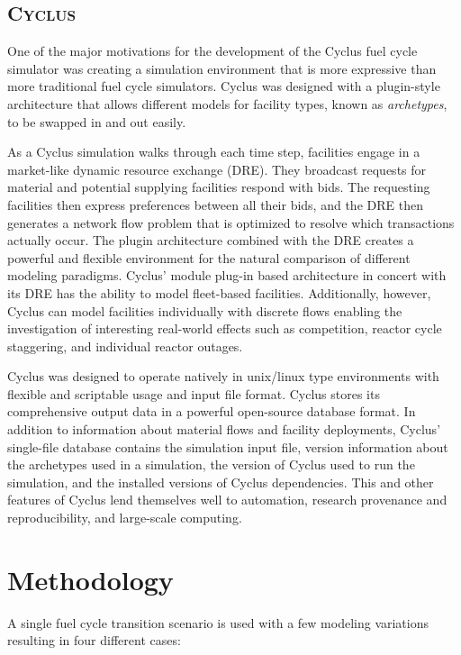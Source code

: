 \documentclass{style}
\newcommand{\Cyclus}{\textsc{Cyclus}\xspace}%
\begin{document}
\subsection{\Cyclus}

One of the major motivations for the development of the Cyclus fuel cycle
simulator \cite{cyclus_2015} was creating a simulation environment that is
more expressive than more traditional fuel cycle simulators.  Cyclus was
designed with a plugin-style architecture that allows different models for
facility types, known as \emph{archetypes}, to be swapped in and out easily.

As a Cyclus simulation walks through each time step, facilities engage in a
market-like dynamic resource exchange (DRE).  They broadcast requests for
material and potential supplying facilities respond with bids. The requesting facilities then
express preferences between all their bids, and the DRE then generates a network
flow problem that is optimized to resolve which transactions actually occur.
The plugin architecture combined with the DRE creates a powerful and flexible
environment for the natural comparison of different modeling paradigms.
Cyclus' module plug-in based architecture in concert with its DRE has the ability to
model fleet-based facilities.  Additionally, however, Cyclus can model
facilities individually with discrete flows enabling the investigation of
interesting real-world effects such as competition, reactor cycle staggering,
and individual reactor outages. 

Cyclus was designed to operate natively in unix/linux type environments with
flexible and scriptable usage and input file format.  Cyclus stores its
comprehensive output data in a powerful open-source database format.  In addition
to information about material flows and facility deployments, Cyclus'
single-file database contains the simulation input file, version information
about the archetypes used in a simulation, the version of Cyclus used to run
the simulation, and the installed versions of Cyclus dependencies. This and
other features of Cyclus lend themselves well to automation, research
provenance and reproducibility, and large-scale computing.

\section{Methodology}

A single fuel cycle transition scenario is used with a few modeling variations
resulting in four different cases:
\end{document}
